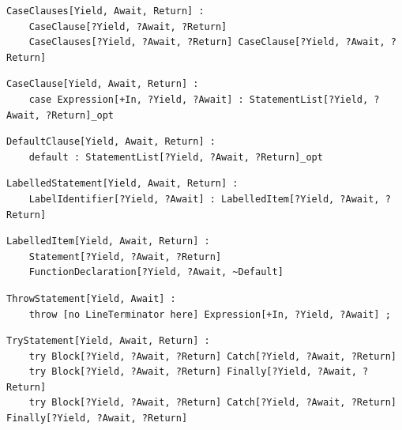\noindent\textbf{\texttt{}}\par
\begin{lstlisting}
CaseClauses[Yield, Await, Return] :
    CaseClause[?Yield, ?Await, ?Return]
    CaseClauses[?Yield, ?Await, ?Return] CaseClause[?Yield, ?Await, ?Return]
\end{lstlisting}

\noindent\textbf{\texttt{}}\par
\begin{lstlisting}
CaseClause[Yield, Await, Return] :
    case Expression[+In, ?Yield, ?Await] : StatementList[?Yield, ?Await, ?Return]_opt
\end{lstlisting}

\noindent\textbf{\texttt{}}\par
\begin{lstlisting}
DefaultClause[Yield, Await, Return] :
    default : StatementList[?Yield, ?Await, ?Return]_opt
\end{lstlisting}

\noindent\textbf{\texttt{}}\par
\begin{lstlisting}
LabelledStatement[Yield, Await, Return] :
    LabelIdentifier[?Yield, ?Await] : LabelledItem[?Yield, ?Await, ?Return]
\end{lstlisting}

\noindent\textbf{\texttt{}}\par
\begin{lstlisting}
LabelledItem[Yield, Await, Return] :
    Statement[?Yield, ?Await, ?Return]
    FunctionDeclaration[?Yield, ?Await, ~Default]
\end{lstlisting}

\noindent\textbf{\texttt{}}\par
\begin{lstlisting}
ThrowStatement[Yield, Await] :
    throw [no LineTerminator here] Expression[+In, ?Yield, ?Await] ;
\end{lstlisting}

\noindent\textbf{\texttt{}}\par
\begin{lstlisting}
TryStatement[Yield, Await, Return] :
    try Block[?Yield, ?Await, ?Return] Catch[?Yield, ?Await, ?Return]
    try Block[?Yield, ?Await, ?Return] Finally[?Yield, ?Await, ?Return]
    try Block[?Yield, ?Await, ?Return] Catch[?Yield, ?Await, ?Return] Finally[?Yield, ?Await, ?Return]
\end{lstlisting}


